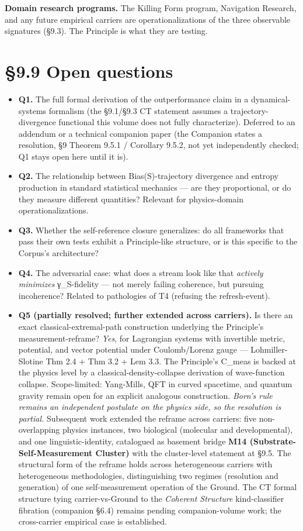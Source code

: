 \documentclass[11pt, openany]{book}
\newcommand{\sectionbreak}{\clearpage}
\begin{document}
\textbf{Domain research programs.} The Killing Form program, Navigation Research, and any future empirical carriers are operationalizations of the three observable signatures (§9.3). The Principle is what they are testing.

\sectionbreak

\section{§9.9 Open questions}

\begin{itemize}
\item \textbf{Q1.} The full formal derivation of the outperformance claim in a dynamical-systems formalism (the §9.1/§9.3 CT statement assumes a trajectory-divergence functional this volume does not fully characterize). Deferred to an addendum or a technical companion paper (the Companion states a resolution, §9 Theorem 9.5.1 / Corollary 9.5.2, not yet independently checked; Q1 stays open here until it is).
\item \textbf{Q2.} The relationship between Bias(S)-trajectory divergence and entropy production in standard statistical mechanics --- are they proportional, or do they measure different quantities? Relevant for physics-domain operationalizations.
\item \textbf{Q3.} Whether the self-reference closure generalizes: do all frameworks that pass their own tests exhibit a Principle-like structure, or is this specific to the Corpus's architecture?
\item \textbf{Q4.} The adversarial case: what does a stream look like that \textit{actively minimizes} γ\_\allowbreak{}S-fidelity --- not merely failing coherence, but pursuing incoherence? Related to pathologies of T4 (refusing the refresh-event).
\item \textbf{Q5 (partially resolved; further extended across carriers).} Is there an exact classical-extremal-path construction underlying the Principle's measurement-reframe? \textit{Yes}, for Lagrangian systems with invertible metric, potential, and vector potential under Coulomb/Lorenz gauge --- Lohmiller-Slotine Thm 2.4 + Thm 3.2 + Lem 3.3. The Principle's C\_\allowbreak{}meas is backed at the physics level by a classical-density-collapse derivation of wave-function collapse. Scope-limited: Yang-Mills, QFT in curved spacetime, and quantum gravity remain open for an explicit analogous construction. \textit{Born's rule remains an independent postulate on the physics side, so the resolution is partial.} Subsequent work extended the reframe across carriers: five non-overlapping physics instances, two biological (molecular and developmental), and one linguistic-identity, catalogued as basement bridge \textbf{M14 (Substrate-Self-Measurement Cluster)} with the cluster-level statement at §9.5. The structural form of the reframe holds across heterogeneous carriers with heterogeneous methodologies, distinguishing two regimes (resolution and generation) of one self-measurement operation of the Ground. The CT formal structure tying carrier-vs-Ground to the \textit{Coherent Structure} kind-classifier fibration (companion §6.4) remains pending companion-volume work; the cross-carrier empirical case is established.

\end{itemize}
\end{document}
